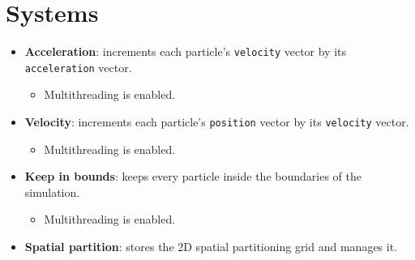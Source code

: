 \documentclass[twoside, 12pt, a4paper, openany]{book}
\providecommand{\tightlist}{%
  \setlength{\itemsep}{0pt}\setlength{\parskip}{0pt}}
\begin{document}
\section{Systems}\label{systems}

\begin{itemize}
\item
  \textbf{Acceleration}: increments each particle's
  \texttt{velocity}
  vector by its
  \texttt{acceleration}
  vector.

  \begin{itemize}
  \tightlist
  \item
    Multithreading is enabled.
  \end{itemize}
\item
  \textbf{Velocity}: increments each particle's
  \texttt{position}
  vector by its
  \texttt{velocity}
  vector.

  \begin{itemize}
  \tightlist
  \item
    Multithreading is enabled.
  \end{itemize}
\item
  \textbf{Keep in bounds}: keeps every particle inside the boundaries of
  the simulation.

  \begin{itemize}
  \tightlist
  \item
    Multithreading is enabled.
  \end{itemize}
\item
  \textbf{Spatial partition}: stores the 2D spatial partitioning grid
  and manages it.


\end{itemize}
\end{document}
